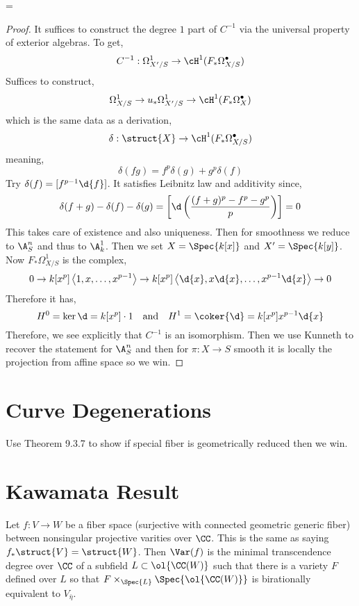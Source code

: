 =\documentclass[12pt]{article}
\begin{document}
\begin{proof}
It suffices to construct the degree $1$ part of $C^{-1}$ via the universal property of exterior algebras. To get,
\[ C^{-1} : \Omega^1_{X'/S} \to \cH^1(F_* \Omega^\bullet_{X/S}) \]
Suffices to construct,
\[ \Omega_{X/S}^1 \to u_* \Omega_{X'/S}^1 \to \cH^1(F_* \Omega_X^\bullet) \]
which is the same data as a derivation,
\[ \delta : \struct{X} \to \cH^1(F_* \Omega_{X/S}^\bullet) \]
meaning,
\[ \delta(fg) = f^p \delta(g) + g^p \delta(f) \]
Try $\delta(f) = [f^{p-1} \d{f}]$. It satisfies Leibnitz law and additivity since,
\[ \delta(f+g) - \delta(f) - \delta(g) = \left[ \d \left( \frac{(f+g)^p - f^p - g^p}{p} \right) \right] = 0 \]
This takes care of existence and also uniqueness. Then for smoothness we reduce to $\A^n_S$ and thus to $\A^1_{k}$. Then we set $X = \Spec{k[x]}$ and $X' = \Spec{k[y]}$. Now $F_* \Omega^1_{X/S}$ is the complex,
\[ 0 \to k[x^p] \left< 1, x, \dots, x^{p-1} \right> \to k[x^p] \left< \d{x}, x \d{x}, \dots, x^{p-1} \d{x} \right> \to 0 \]
Therefore it has,
\[ H^0 = \ker{\d} = k[x^p] \cdot 1 \quad \text{and} \quad H^1 = \coker{\d} = k[x^p] x^{p-1} \d{x} \]
Therefore, we see explicitly that $C^{-1}$ is an isomorphism. Then we use Kunneth to recover the statement for $\A^n_S$ and then for $\pi : X \to S$ smooth it is \etale locally the projection from affine space so we win.
\end{proof}

\section{Curve Degenerations}

Use Theorem 9.3.7 to show if special fiber is geometrically reduced then we win.

\section{Kawamata Result}

\begin{defn}
Let $f : V \to W$ be a fiber space (surjective with connected geometric generic fiber) between nonsingular projective varities over $\CC$. This is the same as saying $f_* \struct{V} = \struct{W}$. Then $\Var(f)$ is the minimal transcendence degree over $\CC$ of a subfield $L \subset \ol{\CC(W)}$ such that there is a variety $F$ defined over $L$ so that $F \times_{\Spec{L}} \Spec{\ol{\CC(W)}}$ is birationally equivalent to $V_{\bar{\eta}}$.
\end{defn}
\end{document}
